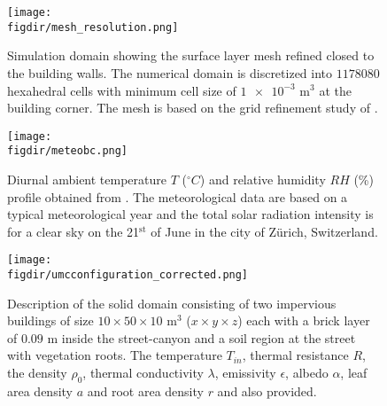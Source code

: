 \begin{figure}[p]
	\centering
	\texttt{[image: \\figdir/mesh\_resolution.png]}
	\caption{Simulation domain showing the surface layer mesh refined closed to the building walls. The numerical domain is discretized into $\num{1178080}$ hexahedral cells with minimum cell size of $\num{1e-3}$ m$^{3}$ at the building corner. The mesh is based on the grid refinement study of \cite{Kubilay2018}.}
	\label{fig:mesh_resolution}
\end{figure}

\begin{figure}[p]
	\centering
	\texttt{[image: \\figdir/meteobc.png]}
	\caption{Diurnal ambient temperature $T$ ($^{\circ}C$) and relative humidity $RH$ (\%) profile obtained from \cite{Kubilay2018}. The meteorological data are based on a typical meteorological year and the total solar radiation intensity is for a clear sky on the 21$^{\mathrm{st}}$ of June in the city of Z\"urich, Switzerland. }
	\label{fig:meteobc}
\end{figure}

\begin{figure}[p]
	\centering
	\texttt{[image: \\figdir/umcconfiguration\_corrected.png]}%
	\caption{Description of the solid domain consisting of two impervious buildings of size $10 \times 50 \times 10$ m$^3$ ($x\times y \times z$) each with a brick layer of $0.09$ m inside the street-canyon and a soil region at the street with vegetation roots. The temperature $T_{\textit{in}}$, thermal resistance $R$, the density $\rho_0$, thermal conductivity $\lambda$, emissivity $\epsilon$, albedo $\alpha$, leaf area density $a$ and root area density $r$ and also provided. }
	\label{fig:soliddomain}
\end{figure}


